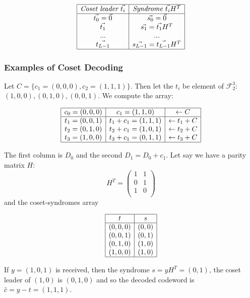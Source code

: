 \documentclass{article}
\begin{document}
\renewcommand{\arraystretch}{1.5} %
\begin{center} %
\[ %
\begin{array}{|c|c|} \hline %
\textit{Coset leader } \vec{t_i} & \textit{Syndrome } \vec{t_i}H^T\\ \hline
\vec{t_0} = \vec{0} & \vec{s_0} = \vec{0}\\
\vec{t_1} & \vec{s_1} = \vec{t_1}H^T\\
... & ...\\
\vec{t_{L-1}} & \vec{s_{L-1}} = \vec{t_{L-1}}H^T\\
\hline
\end{array} %
\] %
\end{center}

\subsubsection{Examples of Coset Decoding} Let $ C = \{c_1 = (0,0,0), c_2 = (1,1,1)\} $. Then let the $ t_i $ be element of $ \mathcal{F}_{2}^{3} $: $ (1,0,0),(0,1,0),(0,0,1) $. We compute the array:
\begin{center} %
\[ %
\begin{array}{|c|c|c|} \hline %
c_0 = (0,0,0) & c_1 = (1,1,0) & \leftarrow C\\ \hline
t_1 = (0,0,1) & t_1 + c_1 = (1,1,1) & \leftarrow t_1 + C\\
t_2 = (0,1,0) & t_2 + c_1 = (1,0,1) & \leftarrow t_2 + C\\
t_3 = (1,0,0) & t_3 + c_1 = (0,1,1) & \leftarrow t_3 + C\\
\hline
\end{array} %
\] %
\end{center}
The first column is $ D_0 $ and the second $ D_1 = D_0 + c_1 $. Let say we have a parity matrix $ H $:
\begin{equation}
H^T =
\begin{pmatrix}
1 & 1 \\
0 & 1 \\
1 & 0 \\
\end{pmatrix}
\end{equation}
and the coset-syndromes array
\begin{center}
\[ %
\begin{array}{|c|c|} \hline %
t & s\\ \hline
(0,0,0) & (0,0)\\
(0,0,1) & (0,1)\\
(0,1,0) & (1,0)\\
(1,0,0) & (1,0)\\
\hline
\end{array} %
\] %
\end{center}
If $ y = (1,0,1) $ is received, then the syndrome $ s = yH^T = (0,1) $, the coset leader of $ (1,0) $ is $ (0,1,0) $ and so the decoded codeword is $ \hat{c} = y - t = (1,1,1) $.
\end{document}
